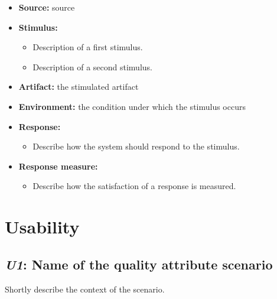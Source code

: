 \documentclass[english,peerreview]{sareport}
\begin{document}
\begin{itemize}
    \item \textbf{Source:} source
    \item \textbf{Stimulus:}
        \begin{itemize}
            \item Description of a first stimulus.
            \item Description of a second stimulus.
        \end{itemize}

    \item \textbf{Artifact:} the stimulated artifact
    \item \textbf{Environment:} the condition under which the stimulus occurs
    \item \textbf{Response:}
        \begin{itemize}
            \item Describe how the system should respond to the stimulus.
        \end{itemize}

    \item \textbf{Response measure:}
        \begin{itemize}
            \item Describe how the satisfaction of a response is measured.
        \end{itemize}
\end{itemize}

\section{Usability}
\subsection{\emph{U1}: Name of the quality attribute scenario}
Shortly describe the context of the scenario.
\end{document}
